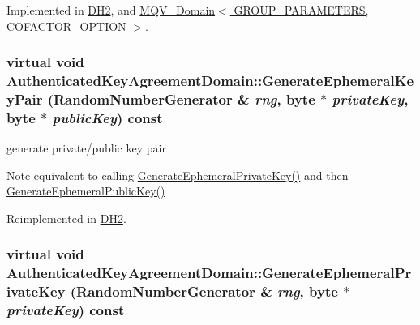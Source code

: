Implemented in \hyperlink{class_d_h2_a561ed549ab2f287bd5f72be06e217290}{DH2}, and \hyperlink{class_m_q_v___domain_a9a7642a35cdbaca0023629c0477aefc1}{MQV\_\-Domain$<$ GROUP\_\-PARAMETERS, COFACTOR\_\-OPTION $>$}.\hypertarget{class_authenticated_key_agreement_domain_aafe38894865a6f11c3282c8aa94df29e}{
\subsubsection[{GenerateEphemeralKeyPair}]{\setlength{\rightskip}{0pt plus 5cm}virtual void AuthenticatedKeyAgreementDomain::GenerateEphemeralKeyPair ({\bf RandomNumberGenerator} \& {\em rng}, \/  byte $\ast$ {\em privateKey}, \/  byte $\ast$ {\em publicKey}) const}}
\label{class_authenticated_key_agreement_domain_aafe38894865a6f11c3282c8aa94df29e}


generate private/public key pair \begin{DoxyNote}{Note}
equivalent to calling \hyperlink{class_authenticated_key_agreement_domain_ab6280d3bf8ad1dd2aa976910b81502f8}{GenerateEphemeralPrivateKey()} and then \hyperlink{class_authenticated_key_agreement_domain_a9d1bc83a77f44af6616da42c33b3bc49}{GenerateEphemeralPublicKey()} 
\end{DoxyNote}


Reimplemented in \hyperlink{class_d_h2_a4b5a84bf47e9a18348521b5a9c752cce}{DH2}.\hypertarget{class_authenticated_key_agreement_domain_ab6280d3bf8ad1dd2aa976910b81502f8}{
\subsubsection[{GenerateEphemeralPrivateKey}]{\setlength{\rightskip}{0pt plus 5cm}virtual void AuthenticatedKeyAgreementDomain::GenerateEphemeralPrivateKey ({\bf RandomNumberGenerator} \& {\em rng}, \/  byte $\ast$ {\em privateKey}) const}}
\label{class_authenticated_key_agreement_domain_ab6280d3bf8ad1dd2aa976910b81502f8}


